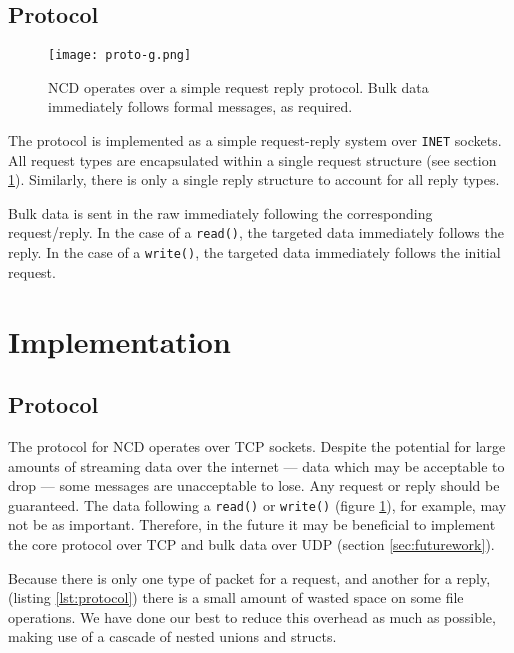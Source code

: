 \documentclass[11pt,twocolumn]{article}
\begin{document}
\subsection{Protocol}

\begin{figure}[h]
  \begin{center}
    \texttt{[image: proto-g.png]}
  \end{center}
  \caption{NCD operates over a simple request reply protocol. Bulk data
  immediately follows formal messages, as required.}
  \label{fig:protocol}
\end{figure}

The protocol is implemented as a simple request-reply system over
\texttt{INET} sockets. All request types are encapsulated within a
single request structure (see section \ref{sec:implementation}).
Similarly, there is only a single reply structure to account for all
reply types.

Bulk data is sent in the raw immediately following the corresponding
request/reply. In the case of a \texttt{read()}, the targeted data
immediately follows the reply. In the case of a \texttt{write()}, the
targeted data immediately follows the initial request.

\section{Implementation}
\label{sec:implementation}

\subsection{Protocol}



The protocol for NCD operates over TCP sockets. Despite the potential
for large amounts of streaming data over the internet --- data which may
be acceptable to drop --- some messages are unacceptable to lose. Any
request or reply should be guaranteed. The data following a
\texttt{read()} or \texttt{write()} (figure \ref{fig:protocol}), for
example, may not be as important. Therefore, in the future it may be
beneficial to implement the core protocol over TCP and bulk data over
UDP (section \ref{sec:futurework}).

Because there is only one type of packet for a request, and another for
a reply, (listing \ref{lst:protocol}) there is a small amount of wasted
space on some file operations. We have done our best to reduce this
overhead as much as possible, making use of a cascade of nested unions
and structs.
\end{document}
